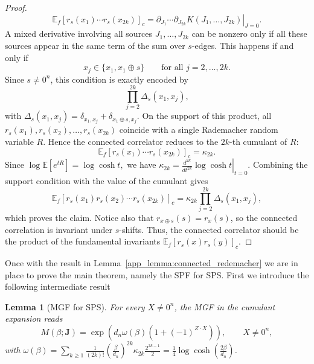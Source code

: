 \documentclass[aps,pra,superscriptaddress,twocolumn,longbibliography]{revtex4-2}
\newtheorem{lemma}{\textbf{Lemma}}
\begin{document}
\begin{proof}
\[
    \mathbb{E}_{f}
    \left[
        r_s(x_1)\cdots r_s(x_{2k})
    \right]_c
    =
    \left.
    \partial_{J_1}\cdots \partial_{J_{2k}}
    K(J_1,\dots,J_{2k})
    \right|_{J=0}.
\]
A mixed derivative involving all sources $J_1,\dots,J_{2k}$ can be nonzero only if all these sources appear in the same term of the sum over $s$-edges. This happens if and only if
%
\begin{equation}
    x_j\in \{x_1,x_1\oplus s\} \qquad \text{for all } j=2,\dots,2k.
\end{equation}
%
Since \(s\neq 0^n\), this condition is exactly encoded by
\[
    \prod_{j=2}^{2k}\Delta_s(x_1,x_j),
\]
with $\Delta_s(x_1,x_j)=\delta_{x_1,x_j}+\delta_{x_1\oplus s,x_j}$. On the support of this product, all  $r_s(x_1),r_s(x_2),\dots,r_s(x_{2k})$ coincide with a single Rademacher random variable \(R\). Hence the connected correlator reduces to the \(2k\)-th cumulant of \(R\):
%
\begin{equation}
     \mathbb{E}_{f}
    \left[
        r_s(x_1)\cdots r_s(x_{2k})
    \right]_c
    =
    \kappa_{2k}.
\end{equation}
%
Since $\log \mathbb{E}[e^{tR}] =\log\cosh t,$ we have $\kappa_{2k} =\left.\frac{d^{2k}}{dt^{2k}}\log\cosh t \right|_{t=0}.$ Combining the support condition with the value of the cumulant gives
%
\begin{equation}
     \mathbb{E}_{f}
    \left[
        r_s(x_1)r_s(x_2)\cdots r_s(x_{2k})
    \right]_c
    =
    \kappa_{2k}
    \prod_{j=2}^{2k}\Delta_s(x_1,x_j),
\end{equation}
%
which proves the claim. Notice also that $r_{x\oplus s}(s) =r_{x}(s)$, so the connected correlation is invariant under $s$-shifts. Thus, the connected correlator should be the product of the fundamental invariants $\mathbb{E}_{f}[r_{s}(x)r_{s}(y)]_{c}$.
\end{proof}

Once with the result in Lemma~\ref{app_lemma:connected_redemacher} we are in place to prove the main theorem, namely the SPF for SPS. First we introduce the following intermediate result 

\begin{lemma}[MGF for SPS]
For every $X\neq 0^{n}$, the MGF in the cumulant expansion reads
%
\begin{equation}
\label{app_eqn:exact_SPS_MGF}
    M(\beta; \mathbf{J}) = \exp\left(d_n\omega(\beta)(1+(-1)^{Z\cdot X})\right), \qquad X\neq0^n,
\end{equation}
%
with $\omega(\beta) = \sum_{k\geq1}\frac{1}{(2k)!} \left(\frac{\beta}{d_n}\right)^{2k} \kappa_{2k}\frac{2^{2k-1}}{2} = \frac{1}{4}\log\cosh\left(\frac{2\beta}{d_n}\right)$.
\end{lemma}
\end{document}
